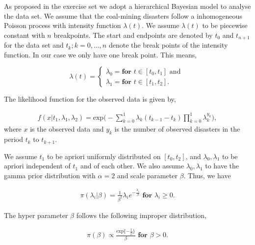 As proposed in the exercise set we adopt a hierarchical Bayesian model to analyse the data set. We assume that the coal-mining disasters follow a inhomogeneous Poisson process with intensity function $\lambda(t)$. We assume $\lambda(t)$ to be piecewise constant with $n$ breakpoints. The start and endpoints are denoted by $t_0$ and $t_{n+1}$ for the data set and $t_k; k = 0,...,n$ denote the break points of the intensity function. In our case we only have one break point. This means,  

\begin{equation}
    \lambda(t) = 
    \begin{cases}
        \lambda_0 = \textbf{for } t \in [t_0,t_{1}] \text{ and }\\
        \lambda_1 = \textbf{for } t \in [t_1, t_2].
    \end{cases}
\end{equation}

The likelihood function for the observed data is given by,

\begin{align}
    f(x|t_1,\lambda_1,\lambda_2) 
    = \text{exp} \Big( - \sum_{k = 0}^1 \lambda_k (t_{k-1} - t_k) \prod_{k = 0}^1 \lambda_k^{y_k} \Big), 
\end{align}
where $x$ is the observed data and $y_k$ is the number of observed disasters in the period $t_k$ to $t_{k+1}$. 

We assume $t_1$ to be apriori uniformly distributed on $[t_0, t_2]$, and $\lambda_0, \lambda_1$ to be apriori independent of $t_1$ and of each other. We also assume $\lambda_0,\lambda_1$ to have the gamma prior distribution with $\alpha = 2$ and scale parameter $\beta$. Thus, we have 

\begin{align}
    \pi(\lambda_i | \beta) = \frac{1}{\beta^2}\lambda_i e^{-\frac{\lambda_i}{\beta}} \textbf{ for } \lambda_i \geq 0.
\end{align}

The hyper parameter $\beta$ follows the following improper distribution,

\begin{align}
    \pi (\beta) \propto \frac{\text{exp}\{ -\frac{1}{\beta} \} }{\beta} \textbf{ for } \beta > 0.
\end{align}

